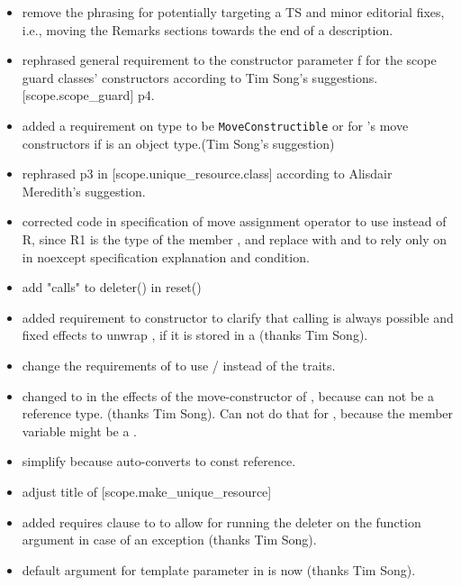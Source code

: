 \documentclass[ebook,11pt,article]{memoir}
\begin{document}
\begin{itemize}
\item remove the phrasing for potentially targeting a TS and minor editorial fixes, i.e., moving the Remarks sections towards the end of a description.
\item rephrased general requirement to the constructor parameter f for the scope guard classes' constructors according to Tim Song's suggestions. [scope.scope_guard] p4.
\item added a requirement on type  to be \lstinline{MoveConstructible} or  for 's move constructors if  is an object type.(Tim Song's suggestion)
\item rephrased p3 in [scope.unique_resource.class] according to Alisdair Meredith's suggestion.
\item corrected code in specification of  move assignment operator to use  instead of R, since R1 is the type of the member , and replace  with  and to rely only on  in noexcept specification explanation and  condition.
\item add "calls" to deleter() in reset()
\item added requirement to  constructor to clarify that calling  is always possible and fixed effects to unwrap , if it is stored in a  (thanks Tim Song).
\item change the requirements of  to use / instead of the traits.
\item changed  to  in the effects of the move-constructor of , because  can not be a reference type. (thanks Tim Song). Can not do that for , because the member variable might be a .
\item simplify  because  auto-converts to const reference.
\item adjust title of [scope.make_unique_resource]
\item added requires clause to  to allow for running the deleter on the function argument in case of an exception (thanks Tim Song).
\item default argument for template parameter  in  is now  (thanks Tim Song).

\end{itemize}
\end{document}
